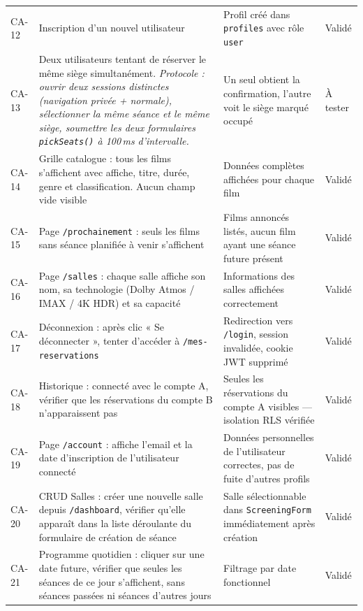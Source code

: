 \documentclass[12pt,a4paper,openany]{report}
\begin{document}
\begin{longtable}{p{1.1cm}p{6.8cm}p{2.8cm}p{1.5cm}}
  CA-12 & Inscription d'un nouvel utilisateur & Profil créé dans \texttt{profiles} avec rôle \texttt{user} & Validé \\[4pt]

  CA-13 & Deux utilisateurs tentant de réserver le même siège simultanément. \textit{Protocole : ouvrir deux sessions distinctes (navigation privée + normale), sélectionner la même séance et le même siège, soumettre les deux formulaires \texttt{pickSeats()} à 100\,ms d'intervalle.} & Un seul obtient la confirmation, l'autre voit le siège marqué occupé & À tester \\[4pt]

  CA-14 & Grille catalogue : tous les films s'affichent avec affiche, titre, durée, genre et classification. Aucun champ vide visible & Données complètes affichées pour chaque film & Validé \\[4pt]

  CA-15 & Page \texttt{/prochainement} : seuls les films sans séance planifiée à venir s'affichent & Films annoncés listés, aucun film ayant une séance future présent & Validé \\[4pt]

  CA-16 & Page \texttt{/salles} : chaque salle affiche son nom, sa technologie (Dolby Atmos / IMAX / 4K HDR) et sa capacité & Informations des salles affichées correctement & Validé \\[4pt]

  CA-17 & Déconnexion : après clic « Se déconnecter », tenter d'accéder à \texttt{/mes-reservations} & Redirection vers \texttt{/login}, session invalidée, cookie JWT supprimé & Validé \\[4pt]

  CA-18 & Historique : connecté avec le compte A, vérifier que les réservations du compte B n'apparaissent pas & Seules les réservations du compte A visibles — isolation RLS vérifiée & Validé \\[4pt]

  CA-19 & Page \texttt{/account} : affiche l'email et la date d'inscription de l'utilisateur connecté & Données personnelles de l'utilisateur correctes, pas de fuite d'autres profils & Validé \\[4pt]

  CA-20 & CRUD Salles : créer une nouvelle salle depuis \texttt{/dashboard}, vérifier qu'elle apparaît dans la liste déroulante du formulaire de création de séance & Salle sélectionnable dans \texttt{ScreeningForm} immédiatement après création & Validé \\[4pt]

  CA-21 & Programme quotidien : cliquer sur une date future, vérifier que seules les séances de ce jour s'affichent, sans séances passées ni séances d'autres jours & Filtrage par date fonctionnel & Validé \\
\end{longtable}
\end{document}
